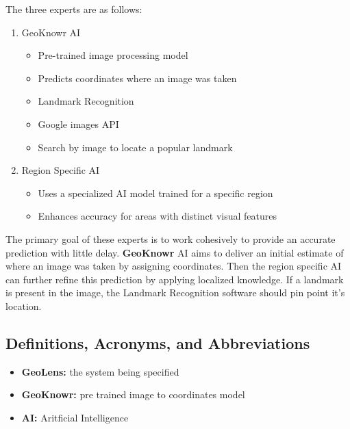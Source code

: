 \documentclass[]{article}
\begin{document}
The three experts are as follows:
\begin{enumerate}
    \item GeoKnowr AI
    \begin{itemize}
        \item Pre-trained image processing model
        \item Predicts coordinates where an image was taken
    \end{itemize}
    \begin{itemize}
    \item Landmark Recognition
        \item Google images API
        \item Search by image to locate a popular landmark
    \end{itemize}
    \item Region Specific AI
	\begin{itemize}
        \item Uses a specialized AI model trained for a specific region
        \item Enhances accuracy for areas with distinct visual features
    \end{itemize}
\end{enumerate}

The primary goal of these experts is to work cohesively to provide an accurate prediction with little delay. \textbf{GeoKnowr} AI aims to deliver an initial estimate
of where an image was taken by assigning coordinates. Then the region specific AI can further refine this prediction by applying localized knowledge. If a landmark is 
present in the image, the Landmark Recognition software should pin point it's location.

\subsection{Definitions, Acronyms, and Abbreviations}
\label{sub:definitions_acronyms_and_abbreviations}
\begin{itemize}
	\item \textbf{GeoLens:} the system being specified
    \item \textbf{GeoKnowr:} pre trained image to coordinates model
	\item \textbf{AI:} Aritficial Intelligence
\end{itemize}
\end{document}
